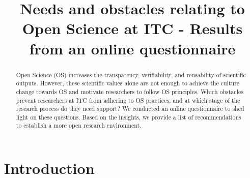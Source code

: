 \documentclass[gc, manuscript]{copernicus}
\begin{document}
\title{Needs and obstacles relating to Open Science at ITC - Results
from an online questionnaire}











\received{}
\pubdiscuss{} %
\revised{}
\accepted{}
\published{}




\maketitle


\begin{abstract}
Open Science (OS) increases the transparency, verifiability, and
reusability of scientific outputs. However, these scientific values
alone are not enough to achieve the culture change towards OS and
motivate researchers to follow OS principles. Which obstacles prevent
researchers at ITC from adhering to OS practices, and at which stage of
the research process do they need support? We conducted an online
questionnaire to shed light on these questions. Based on the insights,
we provide a list of recommendations to establish a more open research
environment.
\end{abstract}




\section{Introduction}
\end{document}
